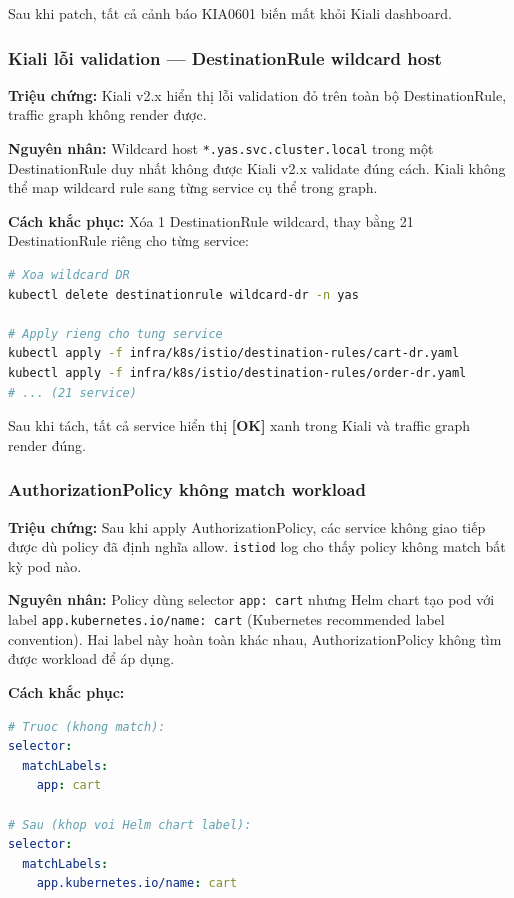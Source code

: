 Sau khi patch, tất cả cảnh báo KIA0601 biến mất khỏi Kiali dashboard.

\subsubsection{Kiali lỗi validation — DestinationRule wildcard host}

\textbf{Triệu chứng:} Kiali v2.x hiển thị lỗi validation đỏ trên toàn bộ DestinationRule, traffic graph không render được.

\textbf{Nguyên nhân:} Wildcard host \texttt{*.yas.svc.cluster.local} trong một DestinationRule duy nhất không được Kiali v2.x validate đúng cách. Kiali không thể map wildcard rule sang từng service cụ thể trong graph.

\textbf{Cách khắc phục:} Xóa 1 DestinationRule wildcard, thay bằng 21 DestinationRule riêng cho từng service:

\begin{lstlisting}[language=bash]
# Xoa wildcard DR
kubectl delete destinationrule wildcard-dr -n yas

# Apply rieng cho tung service
kubectl apply -f infra/k8s/istio/destination-rules/cart-dr.yaml
kubectl apply -f infra/k8s/istio/destination-rules/order-dr.yaml
# ... (21 service)
\end{lstlisting}

Sau khi tách, tất cả service hiển thị \textbf{[OK]} xanh trong Kiali và traffic graph render đúng.

\subsubsection{AuthorizationPolicy không match workload}

\textbf{Triệu chứng:} Sau khi apply AuthorizationPolicy, các service không giao tiếp được dù policy đã định nghĩa allow. \texttt{istiod} log cho thấy policy không match bất kỳ pod nào.

\textbf{Nguyên nhân:} Policy dùng selector \texttt{app: cart} nhưng Helm chart tạo pod với label \texttt{app.kubernetes.io/name: cart} (Kubernetes recommended label convention). Hai label này hoàn toàn khác nhau, AuthorizationPolicy không tìm được workload để áp dụng.

\textbf{Cách khắc phục:}

\begin{lstlisting}[language=yaml]
# Truoc (khong match):
selector:
  matchLabels:
    app: cart

# Sau (khop voi Helm chart label):
selector:
  matchLabels:
    app.kubernetes.io/name: cart
\end{lstlisting}

